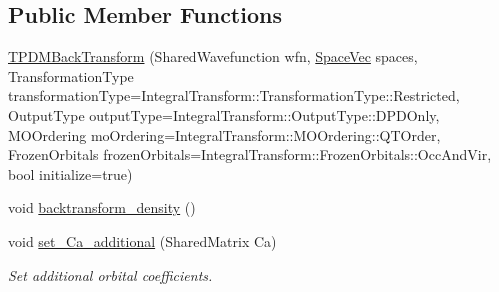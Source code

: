 \subsection*{Public Member Functions}
\begin{DoxyCompactItemize}
\item 
\mbox{\hyperlink{classpsi_1_1_t_p_d_m_back_transform_a1137d921d3764f2bb73644e3b069eb6c}{T\+P\+D\+M\+Back\+Transform}} (Shared\+Wavefunction wfn, \mbox{\hyperlink{namespacepsi_ad84f5058fdd5b69df3b06b9959251147}{Space\+Vec}} spaces, Transformation\+Type transformation\+Type=Integral\+Transform\+::\+Transformation\+Type\+::\+Restricted, Output\+Type output\+Type=Integral\+Transform\+::\+Output\+Type\+::\+D\+P\+D\+Only, M\+O\+Ordering mo\+Ordering=Integral\+Transform\+::\+M\+O\+Ordering\+::\+Q\+T\+Order, Frozen\+Orbitals frozen\+Orbitals=Integral\+Transform\+::\+Frozen\+Orbitals\+::\+Occ\+And\+Vir, bool initialize=true)
\item 
void \mbox{\hyperlink{classpsi_1_1_t_p_d_m_back_transform_a2c6ef8ed232f71dbd235cfec99c0f08b}{backtransform\+\_\+density}} ()
\item 
void \mbox{\hyperlink{classpsi_1_1_t_p_d_m_back_transform_adfa9267d945476f9490bc6c512a03fb3}{set\+\_\+\+Ca\+\_\+additional}} (Shared\+Matrix Ca)
\begin{DoxyCompactList}\small\item\em Set additional orbital coefficients. \end{DoxyCompactList}\end{DoxyCompactItemize}
